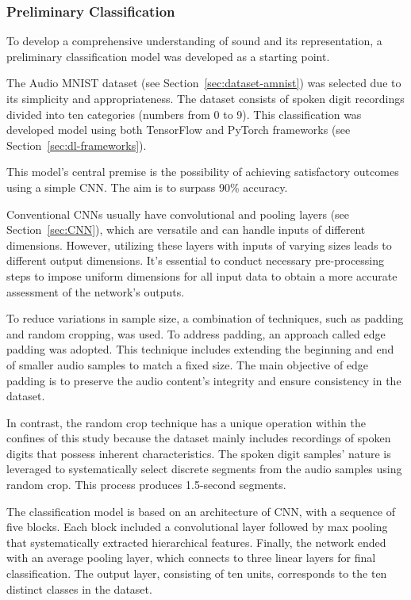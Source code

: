 \subsubsection{Preliminary Classification} \label{sec:classification-model}

To develop a comprehensive understanding of sound and its representation, a preliminary classification model was developed as a starting point.

The Audio MNIST dataset (see Section~\ref{sec:dataset-amnist}) was selected due to its simplicity and appropriateness. The dataset consists of spoken digit recordings divided into ten categories (numbers from 0 to 9). This classification was developed model using both TensorFlow and PyTorch frameworks (see Section~\ref{sec:dl-frameworks}).

This model's central premise is the possibility of achieving satisfactory outcomes using a simple \ac{CNN}. The aim is to surpass 90\% accuracy.

Conventional \acp{CNN} usually have convolutional and pooling layers (see Section~\ref{sec:CNN}), which are versatile and can handle inputs of different dimensions. However, utilizing these layers with inputs of varying sizes leads to different output dimensions. It's essential to conduct necessary pre-processing steps to impose uniform dimensions for all input data to obtain a more accurate assessment of the network's outputs.

To reduce variations in sample size, a combination of techniques, such as padding and random cropping, was used. To address padding, an approach called edge padding was adopted. This technique includes extending the beginning and end of smaller audio samples to match a fixed size. The main objective of edge padding is to preserve the audio content's integrity and ensure consistency in the dataset.

In contrast, the random crop technique has a unique operation within the confines of this study because the dataset mainly includes recordings of spoken digits that possess inherent characteristics. The spoken digit samples' nature is leveraged to systematically select discrete segments from the audio samples using random crop. This process produces 1.5-second segments.

The classification model is based on an architecture of \ac{CNN}, with a sequence of five blocks. Each block included a convolutional layer followed by max pooling that systematically extracted hierarchical features. Finally, the network ended with an average pooling layer, which connects to three linear layers for final classification. The output layer, consisting of ten units, corresponds to the ten distinct classes in the dataset.

